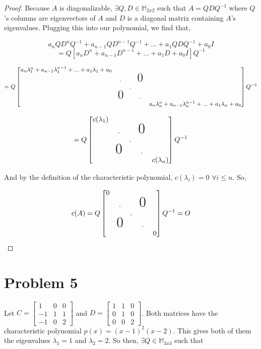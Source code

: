 \documentclass{article}
\begin{document}
\begin{proof}
Because $A$ is diagonalizable, $\exists Q, D \in \mathbb{M}_{2x2}$ such that $A = QDQ^{-1}$ where $Q$'s columns are eigenvectors of $A$ and $D$ is a diagonal matrix containing $A$'s eigenvalues. Plugging this into our polynomial, we find that,

\[ a_nQD^nQ^{-1} + a_{n-1}QD^{n-1}Q^{-1} + ... + a_1QDQ^{-1} + a_0I \]
\[ = Q[a_nD^n + a_{n-1}D^{n-1} + ... + a_1D + a_0I]Q^{-1} \]

\[ = Q\begin{bmatrix} 
	a_n\lambda_1^n + a_{n-1}\lambda_1^{n-1} + ... + a_1\lambda_1 + a_0 \\
	& . 	& 		& \text{\huge{0}}							 \\
	& & . 														 \\
	& \text{\huge{0}} & & .										 \\
	& & & & a_n\lambda_n^n + a_{n-1}\lambda_n^{n-1} + ... + a_1\lambda_n + a_0
\end{bmatrix}Q^{-1} \]

\[ = Q\begin{bmatrix} c(\lambda_1) \\ & . & & \text{\huge{0}} \\ & & . \\ & \text{\huge{0}} && . \\ &&&& c(\lambda_n) \end{bmatrix}Q^{-1}\]

And by the definition of the characteristic polynomial, $c(\lambda_i) = 0$ $\forall i \le n$. So,

\[ c(A) = Q\begin{bmatrix} 0 \\ & . & & \text{\huge{0}} \\ & & . \\ & \text{\huge{0}} && . \\ &&&& 0 \end{bmatrix}Q^{-1} = O \]
\end{proof}

\section*{Problem 5}
Let $C = \begin{bmatrix} 1 & 0 & 0 \\ -1 & 1 & 1 \\ -1 & 0 & 2 \end{bmatrix}$ and $D = \begin{bmatrix} 1 & 1 & 0 \\ 0 & 1 & 0 \\ 0 & 0 & 2 \end{bmatrix}$. Both matrices have the characteristic polynomial $p(x) = (x-1)^2(x-2)$. This gives both of them the eigenvalues $\lambda_1 = 1$ and $\lambda_2 = 2$. So then, $\exists Q \in \mathbb{M}_{3x3}$ such that
\end{document}
